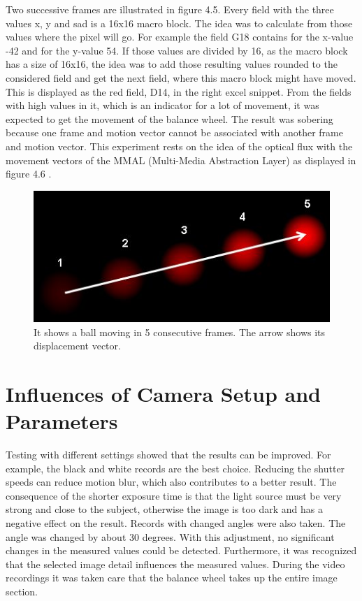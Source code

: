 \documentclass[12pt, a4paper]{report}
\begin{document}
    Two successive frames are illustrated in figure 4.5. Every field with the three values x, y and sad is a 16x16 macro block. The idea was to calculate from those values where the pixel will go. For example the field G18 contains for the x-value -42 and for the y-value 54. If those values are divided by 16, as the macro block has a size of 16x16, the idea was to add those resulting values rounded to the  considered field and get the next field, where this macro block might have moved. This is displayed as the red field, D14, in the right excel snippet. From the fields with high values in it, which is an indicator for a lot of movement, it was expected to get the movement of the balance wheel. 
    The result was sobering because one frame and motion vector cannot be associated with another frame and motion vector.
    This experiment rests on the idea of the optical flux with the movement vectors of the MMAL (Multi-Media Abstraction Layer) as displayed in figure 4.6 .
    
    \noindent
    \begin{figure}[H]
    \centering
    \includegraphics[scale=0.7]{Images/optical_flow_basic1.jpg}
    
    \caption{It shows a ball moving in 5 consecutive frames. The arrow shows its displacement vector.}
    \end{figure}
    
    \section{Influences of Camera Setup and Parameters}
    Testing with different settings showed that the results can be improved. For example, the black and white records are the best choice. Reducing the shutter speeds can reduce motion blur, which also contributes to a better result.
    The consequence of the shorter exposure time is that the light source must be very strong and close to the subject, otherwise the image is too dark and has a negative effect on the result.
    Records with changed angles were also taken. The angle was changed by about 30 degrees. With this adjustment, no significant changes in the measured values could be detected.
    Furthermore, it was recognized that the selected image detail influences the measured values. During the video recordings it was taken care that the balance wheel takes up the entire image section.
    \newpage
    
\end{document}
